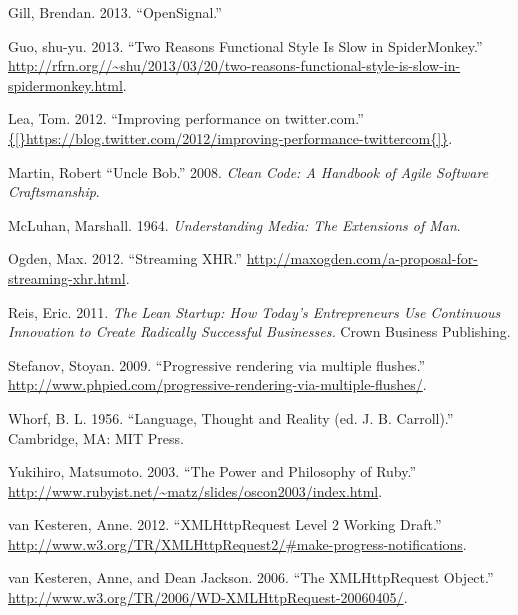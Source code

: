 \documentclass[]{article}
\begin{document}
Gill, Brendan. 2013. ``OpenSignal.''

Guo, shu-yu. 2013. ``Two Reasons Functional Style Is Slow in
SpiderMonkey.''
\url{http://rfrn.org//~shu/2013/03/20/two-reasons-functional-style-is-slow-in-spidermonkey.html}.

Lea, Tom. 2012. ``Improving performance on twitter.com.''
\url{{[}https://blog.twitter.com/2012/improving-performance-twittercom{]}}.

Martin, Robert ``Uncle Bob.'' 2008. \emph{Clean Code: A Handbook of
Agile Software Craftsmanship}.

McLuhan, Marshall. 1964. \emph{Understanding Media: The Extensions of
Man}.

Ogden, Max. 2012. ``Streaming XHR.''
\url{http://maxogden.com/a-proposal-for-streaming-xhr.html}.

Reis, Eric. 2011. \emph{The Lean Startup: How Today's Entrepreneurs Use
Continuous Innovation to Create Radically Successful Businesses.} Crown
Business Publishing.

Stefanov, Stoyan. 2009. ``Progressive rendering via multiple flushes.''
\url{http://www.phpied.com/progressive-rendering-via-multiple-flushes/}.

Whorf, B. L. 1956. ``Language, Thought and Reality (ed. J. B.
Carroll).'' Cambridge, MA: MIT Press.

Yukihiro, Matsumoto. 2003. ``The Power and Philosophy of Ruby.''
\url{http://www.rubyist.net/~matz/slides/oscon2003/index.html}.

van Kesteren, Anne. 2012. ``XMLHttpRequest Level 2 Working Draft.''
\url{http://www.w3.org/TR/XMLHttpRequest2/\#make-progress-notifications}.

van Kesteren, Anne, and Dean Jackson. 2006. ``The XMLHttpRequest
Object.'' \url{http://www.w3.org/TR/2006/WD-XMLHttpRequest-20060405/}.
\end{document}
